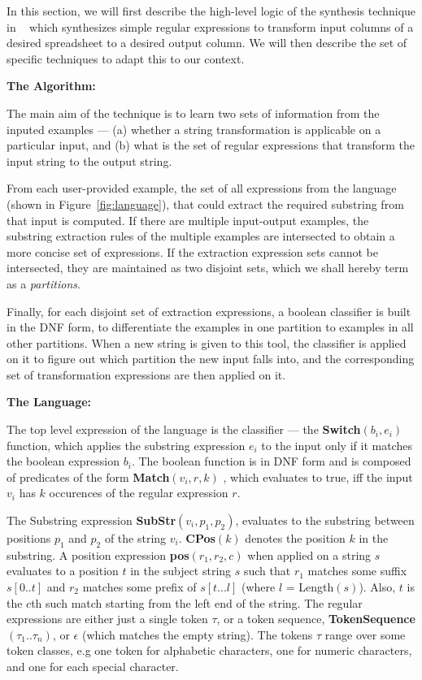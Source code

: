 In this section, we will first describe the high-level logic of the synthesis technique in ~\cite{gulwani} which synthesizes simple regular expressions to transform input columns of a desired spreadsheet to a desired output column. We will then describe the set of specific techniques to adapt this to our context. 

{\bf The Algorithm:}

The main aim of the technique is to learn two sets of information from the inputed examples --- (a) whether a string transformation is applicable on a particular input, and (b) what is the set of regular expressions that transform the input string to the output string.

From each user-provided example, the set of all expressions from the language (shown in Figure~\ref{fig:language}), that could extract the required substring from that input is computed. If there are multiple input-output examples, the substring extraction rules of the multiple examples are intersected to obtain a more concise set of expressions. If the extraction expression sets cannot be intersected, they are maintained as two disjoint sets, which we shall hereby term as a {\it partitions}. 

Finally, for each disjoint set of extraction expressions, a boolean classifier is built in the DNF form, to differentiate the examples in one partition to examples in all other partitions. When a new string is given to this tool, the classifier is applied on it to figure out which partition the new input falls into, and the corresponding set of transformation expressions are then applied on it.

{\bf The Language:}

The top level expression of the language is the classifier --- the {\bf Switch}$(b_i,e_i)$ function, which applies the substring expression $e_i$ to the input only if it matches the boolean expression $b_i$. The boolean function is in DNF form and is composed of predicates of the form {\bf Match}$(v_i,r,k)$ , which evaluates to true, iff the input $v_i$ has $k$ occurences of the regular expression $r$.

The Substring expression {\bf SubStr}$(v_i,p_1,p_2)$, evaluates to the substring between positions $p_1$ and $p_2$ of the string $v_i$. {\bf CPos}$(k)$ denotes the position $k$ in the substring. A position expression {\bf pos}$(r_1,r_2,c)$ when applied on a string $s$ evaluates to a position $t$ in the subject string $s$ such that $r_1$ matches some suffix $s[0 ..t]$ and $r_2$ matches some prefix of $s[t ... l]$ (where $l$ = Length$(s)$). Also, $t$ is the $c$th such match starting from the left end of the string. The regular expressions are either just a single token $\tau$, or a token sequence, {\bf TokenSequence}$(\tau_1 .. \tau_n)$, or $\epsilon$ (which matches the empty string). The tokens $\tau$ range over some token classes, e.g one token for alphabetic characters, one for numeric characters, and one for each special character. 

